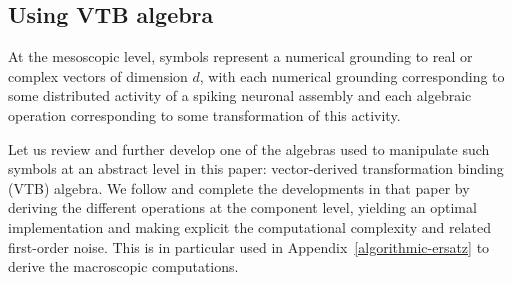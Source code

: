 \documentclass[sn-mathphys]{sn-jnl}
\begin{document}
\begin{appendices}

\section{Using VTB algebra} \label{VTB-algebra}

At the mesoscopic level, symbols represent a numerical grounding to real or complex vectors of dimension $d$, with each numerical grounding corresponding to some distributed activity of a spiking neuronal assembly and each algebraic operation corresponding to some transformation of this activity.

Let us review and further develop one of the algebras used to manipulate such symbols at an abstract level in this paper: vector-derived transformation binding (VTB) algebra. We follow \cite{gosmann_vector-derived_2019} and complete the developments in that paper by deriving the different operations at the component level, yielding an optimal implementation and making explicit the computational complexity and related first-order noise. This is in particular used in Appendix~\ref{algorithmic-ersatz} to derive the macroscopic computations.


\end{appendices}
\end{document}
